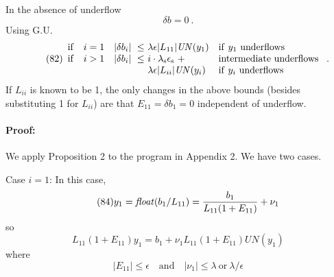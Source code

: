 \documentclass[a4paper]{article}
\begin{document}
In the absence of underflow
\begin{equation}\tag{81}
  \delta b = 0~.
\end{equation}
Using G.U.
\begin{equation}\tag{82}
  \begin{array}{lcl@{~}ll}
    \mathrm{if} & i=1 & |\delta b_i |~ \le &\lambda\epsilon|L_{11}|\mathit{UN}(y_1)
    & \mathrm{if}~y_1~\mathrm{underflows} \\
    \mathrm{if} & i>1 & |\delta b_i |~ \le &i \cdot \lambda_\mathrm{s}\epsilon_\mathrm{s}~ + & \mathrm{intermediate~underflows} \\
    & & & \lambda \epsilon |L_{ii}| \mathit{UN}(y_i) 
    & \mathrm{if}~y_i~\mathrm{underflows}
  \end{array} ~.
\end{equation}
If $L_{ii}$ is known to be 1, the only changes in the above bounds
(besides substituting 1 for $L_{ii}$) are that $E_{11} = \delta b_1 = 0$
independent of underflow.

\paragraph*{Proof:}  We apply Proposition 2 to the program in Appendix 2.
We have two cases.

\noindent Case $i=1$: In this case,
\begin{equation}\tag{84}
  y_1 = \mathit{float}(b_1/L_{11}) = \frac{b_1}{L_{11}(1+E_{11})}+\nu_1
\end{equation}
so
\begin{equation}\tag{85}
  L_{11}(1+E_{11})y_1 = b_1 + \nu_1 L_{11}(1+E_{11})\mathit{UN}(y_1)
\end{equation}
where
\begin{equation}\tag{86}
  |E_{11}|\le \epsilon \quad \mathrm{and} \quad |\nu_1|\le \lambda ~\mathrm{or}~\lambda/\epsilon
\end{equation}
\end{document}
